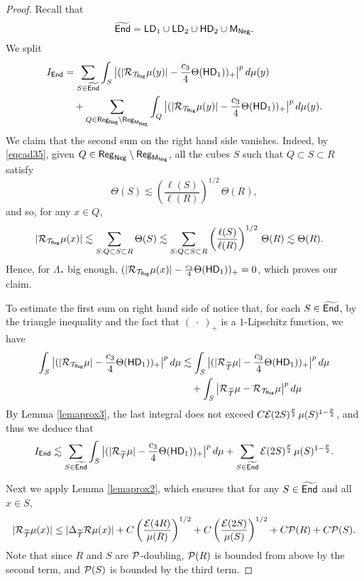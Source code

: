 \begin{proof}
\vv
{}
Recall that
$${\widetilde{{\mathsf{End}}}} =  {\mathsf{LD}}_1 \cup {\mathsf{LD}}_2 \cup {\mathsf{HD}}_2  \cup{\mathsf{M}}_{\mathsf{Neg}}.$$
We split
\begin{align}\label{eqfkzx23}
I_{{\mathsf{End}}} &= \sum_{S\in{\widetilde{{\mathsf{End}}}}} \int_S \big|(|{\mathcal R}_{{\mathcal T}_{\mathsf{Reg}}}\mu(y)| - 
\frac{c_3}4 \Theta({\mathsf{HD}}_1))_+\big|^{p}\,d\mu(y)\\
&\quad + \sum_{Q\in{\mathsf{Reg}}_{\mathsf{Neg}}\setminus {\mathsf{Reg}}_{{\mathsf{M}}_{\mathsf{Neg}}}} \int_Q \big|(|{\mathcal R}_{{\mathcal T}_{\mathsf{Reg}}}\mu(y)| - 
\frac{c_3}4 \Theta({\mathsf{HD}}_1))_+\big|^{p}\,d\mu(y).\nonumber
\end{align}
We claim that the second sum on the right hand side vanishes. Indeed, by \eqref{eqcad35}, given $Q\in{\mathsf{Reg}}_{\mathsf{Neg}}\setminus {\mathsf{Reg}}_{{\mathsf{M}}_{\mathsf{Neg}}}$, all the cubes $S$ such that $Q\subset S\subset R$ satisfy
$$\Theta(S)\lesssim \left(\frac{\ell(S)}{\ell(R)}\right)^{1/2}\,\Theta(R),$$
and so, for any $x\in Q$,
\begin{align*}
|{\mathcal R}_{{\mathcal T}_{\mathsf{Reg}}}\mu(x)| &\lesssim \sum_{S:Q\subset S\subset R} \Theta(S)  \lesssim \sum_{S:Q\subset S\subset R}\left(\frac{\ell(S)}{\ell(R)}\right)^{1/2}\,\Theta(R) \lesssim \Theta(R).
\end{align*}
Hence, for $\Lambda_*$ big enough, $(|{\mathcal R}_{{\mathcal T}_{\mathsf{Reg}}}\mu(x)| - \frac{c_3}4 \Theta({\mathsf{HD}}_1))_+=0$, which proves our claim.

To estimate the first sum on right hand side of  notice that, for each $S\in{\widetilde{{\mathsf{End}}}}$, by the triangle inequality and the fact that $(\;\cdot\;)_+$ is a $1$-Lipschitz function, we have 
\begin{align*}
\int_S \big|(|{\mathcal R}_{{\mathcal T}_{\mathsf{Reg}}}\mu| - 
\frac{c_3}4 \Theta({\mathsf{HD}}_1))_+\big|^{p}\,d\mu &\lesssim 
\int_S \big|(|{\mathcal R}_{{\widetilde{{\mathcal T}}}}\mu| - 
\frac{c_3}4 \Theta({\mathsf{HD}}_1))_+\big|^{p}\,d\mu \\
&\quad+ \int_S\big|{\mathcal R}_{{\widetilde{{\mathcal T}}}}\mu - {\mathcal R}_{{\mathcal T}_{\mathsf{Reg}}}\mu\big|^{p}\,d\mu
\end{align*}
By Lemma \ref{lemaprox3}, the last integral does not exceed 
$C{\mathcal E}(2S)^{\frac{p}2} \,\mu(S)^{1-\frac{p}2}$, and thus we deduce that
\begin{equation}\label{eqIa1}
I_{\mathsf{End}}\lesssim
\sum_{S\in{\widetilde{{\mathsf{End}}}}}\int_S \big|(|{\mathcal R}_{{\widetilde{{\mathcal T}}}}\mu| - 
\frac{c_3}4 \Theta({\mathsf{HD}}_1))_+\big|^{p}\,d\mu + \sum_{S\in{\widetilde{{\mathsf{End}}}}}{\mathcal E}(2S)^{\frac{p}2} \,\mu(S)^{1-\frac {p}2}.
\end{equation}

Next we apply Lemma \ref{lemaprox2}, which ensures that
for any $S\in{\widetilde{{\mathsf{End}}}}$ and all $x\in S$,
\begin{equation}\label{eqIa2}
|{\mathcal R}_{{\widetilde{{\mathcal T}}}}\mu(x)| \leq |\Delta_{{\widetilde{{\mathcal T}}}}{\mathcal R}\mu(x)| + C\left(\frac{{\mathcal E}(4R)}{\mu(R)}\right)^{1/2} +  C\left(\frac{{\mathcal E}(2S)}{\mu(S)}\right)^{1/2} + C{\mathcal P}(R) + C{\mathcal P}(S).
\end{equation}
Note that since $R$ and $S$ are ${\mathcal P}$-doubling, ${\mathcal P}(R)$ is bounded from above by the second term, and ${\mathcal P}(S)$ is bounded by the third term.


\end{proof}
